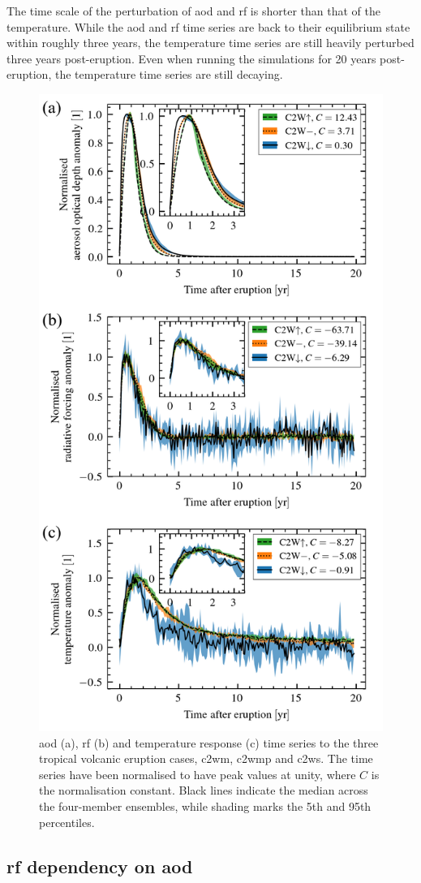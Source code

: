 \documentclass{ametsocV6.1}
\begin{document}
The time scale of the perturbation of \gls{aod} and \gls{rf} is shorter than that of the
temperature. While the \gls{aod} and \gls{rf} time series are back to their equilibrium
state within roughly three years, the temperature time series are still heavily
perturbed three years post-eruption. Even when running the simulations for 20 years
post-eruption, the temperature time series are still decaying.

\begin{figure}
  \centering
  \includegraphics[width=0.5\linewidth]{figures/figure1.png}

  \caption{\gls{aod} (a), \gls{rf} (b) and temperature response (c) time series to the
    three tropical volcanic eruption cases, \gls{c2wm}, \gls{c2wmp} and \gls{c2ws}. The time
    series have been normalised to have peak values at unity, where \(C\) is the
    normalisation constant. Black lines indicate the median across the four-member
    ensembles, while shading marks the 5th and 95th
    percentiles.}\label{fig:1_compare_waveform}%
\end{figure}

\subsection{\gls{rf} dependency on \gls{aod}}
\end{document}
